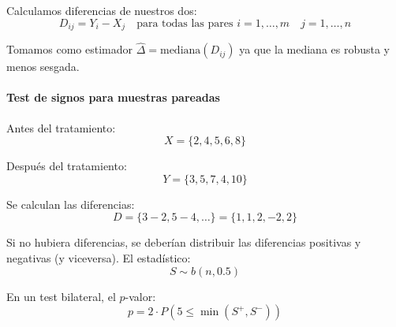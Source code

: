 Calculamos diferencias de nuestros dos:
\[
    D_{ij} = Y_i - X_j \quad \text{para todas las pares } i=1, \dots, m \quad j=1, \dots, n
\]

Tomamos como estimador 
\(\hat{\Delta} = \text{mediana}(D_{ij})\) ya que la mediana es robusta y menos sesgada.

\paragraph{Test de signos para muestras pareadas}

Antes del tratamiento:
\[
    X = \{2, 4, 5, 6, 8\}
\]

Después del tratamiento:
\[
    Y = \{3, 5, 7, 4, 10\}
\]

Se calculan las diferencias:
\[
    D = \{3-2, 5-4, \dots\} = \{1, 1, 2, -2, 2\}
\]

Si no hubiera diferencias, se deberían distribuir las diferencias positivas y negativas (y viceversa). El estadístico:
\[
    S \sim b(n, 0.5)
\]

En un test bilateral, el $p$-valor:
\[
    p = 2 \cdot P(5 \leq \min(S^+, S^-))
\]
